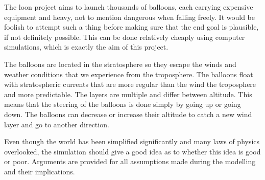 The loon project aims to launch thousands of balloons, each carrying expensive equipment and heavy, not to mention dangerous when falling freely. It would be foolish to attempt such a thing before making sure that the end goal is plausible, if not definitely possible. This can be done relatively cheaply using computer simulations, which is exactly the aim of this project.

The balloons are located in the stratosphere so they escape the winds and weather conditions that we experience from the troposphere. The balloons float with stratospheric currents that are more regular than the wind the troposphere and more predictable. The layers are multiple and differ between altitude. This means that the steering of the balloons is done simply by going up or going down. The balloons can decrease or increase their altitude to catch a new wind layer and go to another direction. 

Even though the world has been simplified significantly and many laws of physics overlooked, the simulation should give a good idea as to whether this idea is good or poor. Arguments are provided for all assumptions made during the modelling and their implications.  